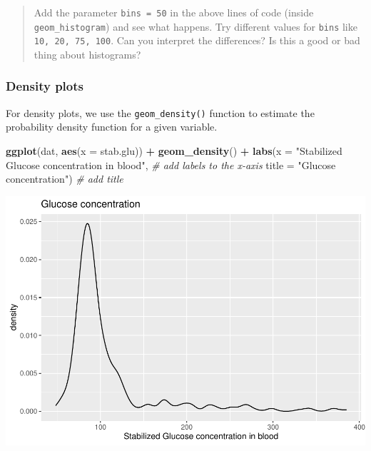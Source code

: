 \documentclass[
]{book}
\newenvironment{Shaded}{\begin{snugshade}}{\end{snugshade}}
\newcommand{\AttributeTok}[1]{\textcolor[rgb]{0.13,0.29,0.53}{#1}}
\newcommand{\CommentTok}[1]{\textcolor[rgb]{0.56,0.35,0.01}{\textit{#1}}}
\newcommand{\FunctionTok}[1]{\textcolor[rgb]{0.13,0.29,0.53}{\textbf{#1}}}
\newcommand{\NormalTok}[1]{#1}
\newcommand{\SpecialCharTok}[1]{\textcolor[rgb]{0.81,0.36,0.00}{\textbf{#1}}}
\newcommand{\StringTok}[1]{\textcolor[rgb]{0.31,0.60,0.02}{#1}}
\begin{document}
\begin{quote}
Add the parameter \texttt{bins\ =\ 50} in the above lines of code (inside \texttt{geom\_histogram}) and see what happens.
Try different values for \texttt{bins} like \texttt{10,\ 20,\ 75,\ 100}. Can you interpret the differences?
Is this a good or bad thing about histograms?
\end{quote}

\hypertarget{density-plots}{%
\subsubsection{Density plots}\label{density-plots}}

For density plots, we use the \texttt{geom\_density()} function to estimate the probability density function for a given variable.

\begin{Shaded}
\begin{Highlighting}[]
\FunctionTok{ggplot}\NormalTok{(dat,}
       \FunctionTok{aes}\NormalTok{(}\AttributeTok{x =}\NormalTok{ stab.glu)) }\SpecialCharTok{+}
  \FunctionTok{geom\_density}\NormalTok{() }\SpecialCharTok{+}
  \FunctionTok{labs}\NormalTok{(}\AttributeTok{x =} \StringTok{"Stabilized Glucose concentration in blood"}\NormalTok{,  }\CommentTok{\# add labels to the x{-}axis}
       \AttributeTok{title =} \StringTok{"Glucose concentration"}\NormalTok{)                  }\CommentTok{\# add title}
\end{Highlighting}
\end{Shaded}

\includegraphics{_main_files/figure-latex/unnamed-chunk-48-1.pdf}
\end{document}
